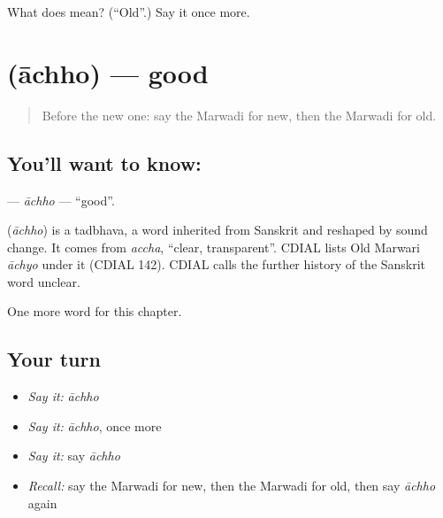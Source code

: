 \begin{tcolorbox}[breakable,colback=teal!4,colframe=teal!35!black,title={Before you move on}]
What does  mean? (\textquotedblleft{}Old\textquotedblright{}.) Say it once more.
\end{tcolorbox}
\section[\texorpdfstring{\mw{आछो} (āchho)}{आछो (āchho)}]{ (āchho) — good}

\label{lesson:MW-C73-achho}



\begin{quote}
Before the new one: say the Marwadi for new, then the Marwadi for old.
\end{quote}

\subsection*{You'll want to know: }
\textbf{} — \emph{āchho} — \textquotedblleft{}good\textquotedblright{}.

\begin{cousinweb}
\textbf{} (\emph{āchho}) is a tadbhava, a word inherited from Sanskrit and reshaped by sound change. It comes from \emph{accha}, \textquotedblleft{}clear, transparent\textquotedblright{}. CDIAL lists Old Marwari \emph{āchyo} under it (CDIAL 142). CDIAL calls the further history of the Sanskrit word unclear.
\end{cousinweb}

\begin{grammarlens}[title={What you've built}]
One more word for this chapter.
\end{grammarlens}

\subsection*{Your turn}
\begin{itemize}
\raggedright
  \item \emph{Say it:} \emph{āchho}
  \item \emph{Say it:} \emph{āchho}, once more
  \item \emph{Say it:} say \emph{āchho}
  \item \emph{Recall:} say the Marwadi for new, then the Marwadi for old, then say \emph{āchho} again
\end{itemize}

